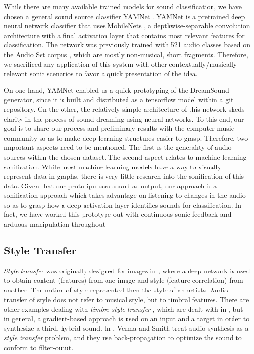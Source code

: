 \documentclass[a4paper,10pt,oneside]{article}
\begin{document}
\begin{sloppy}
While there are many available trained models for sound classification, we have chosen a general sound source classifier YAMNet \cite{YamNet2020}. YAMNet is a pretrained deep neural network classifier that uses MobileNets \cite{howard2017mobilenets}, a depthwise-separable convolution architecture with a final activation layer that contains most relevant features for classification. The network was previously trained with 521 audio classes based on the Audio  Set corpus \cite{2017audioset}, which are mostly non-musical, short fragments. Therefore, we sacrificed any application of this system with other contextually/musically relevant sonic scenarios to favor a quick presentation of the idea. 

On one hand, YAMNet enabled us a quick prototyping of the DreamSound generator, since it is built and distributed as a tensorflow model within a git repository. On the other, the relatively simple architecture of this network sheds clarity in the process of sound dreaming using neural networks. To this end, our goal is to share our process and preliminary results with the computer music community so as to make deep learning structures easier to grasp. Therefore, two important aspects need to be mentioned. The first is the generality of audio sources within the chosen dataset. The second aspect relates to machine learning sonification. While most machine learning models have a way to visually represent data in graphs, there is very little research into the sonification of this data. Given that our prototipe uses sound as output, our approach is a sonification approach which takes advantage on listening to changes in the audio so as to grasp how a deep activation layer identifies sounds for classification. In fact, we have worked this prototype out with continuous sonic feedback and arduous manipulation throughout.

\subsection{Style Transfer}

\textit{Style transfer} was originally designed for images in \cite{GatysEB15a}, where a deep network is used to obtain content (features) from one image and style (feature correlation) from another. The notion of style represented then the style of an artists. Audio transfer of style does not refer to musical style, but to timbral features. There are other examples dealing with \textit{timbre style transfer} \cite{Foote2016, Ulyanov2016, Wyse2017}, which are dealt with in \cite{Briot2017}, but in general, a gradient-based approach is used on an input and a target in order to synthesize a third, hybrid sound. In \cite{verma2018neural}, Verma and Smith treat audio synthesis as a \textit{style transfer} problem, and they use back-propagation to optimize the sound to conform to filter-outut. 















\end{sloppy}
\end{document}
